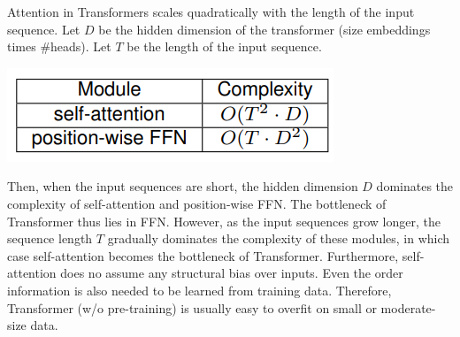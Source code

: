 Attention in Transformers scales quadratically with the length of the input sequence. Let $D$ be the hidden dimension of the transformer (size embeddings times \#heads). Let $T$ be the length of the input sequence.
\begin{center}
    \includegraphics[]{images/attention-complexity.png}
\end{center}
Then, when the input sequences are short, the hidden dimension $D$ dominates the complexity of self-attention and position-wise FFN. The bottleneck of Transformer thus lies in FFN. However, as the input sequences grow longer, the sequence length $T$ gradually dominates the complexity of these modules, in which case self-attention becomes the bottleneck of Transformer.\newline\newline
Furthermore, self-attention does no assume any structural bias over inputs. Even the order information is also needed to be learned from training data. Therefore, Transformer (w/o pre-training) is usually easy to overfit on small or moderate-size data.

